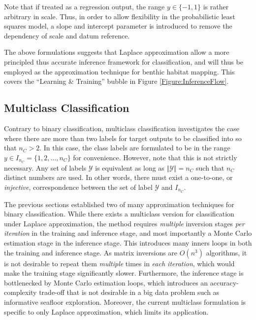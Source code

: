 				Note that if treated as a regression output, the range $y \in \{-1, 1\}$ is rather arbitrary in scale. Thus, in order to allow flexibility in the probabilistic least squares model, a slope and intercept parameter is introduced to remove the dependency of scale and datum reference.
				
				The above formulations suggests that Laplace approximation allow a more principled thus accurate inference framework for classification, and will thus be employed as the approximation technique for benthic habitat mapping. This covers the ``Learning \& Training'' bubble in Figure \ref{Figure:InferenceFlow}.
			
		\subsection{Multiclass Classification}
		\label{BenthicHabitatMapping:Classification:MulticlassClassification}
		
			Contrary to binary classification, multiclass classification investigates the case where there are more than two labels for target outputs to be classified into so that $n_{C} > 2$. In this case, the class labels are formulated to be in the range $y \in I_{n_{C}} = \{1, 2, \dots, n_{C}\}$ for convenience. However, note that this is not strictly necessary. Any set of labels $\mathcal{Y}$ is equivalent as long as $\Vert \mathcal{Y} \Vert = n_{C}$ such that $n_{C}$ distinct numbers are used. In other words, there must exist a one-to-one, or \textit{injective}, correspondence between the set of label $\mathcal{Y}$ and $I_{n_{C}}$.
			
			The previous sections established two of many approximation techniques for binary classification. While there exists a multiclass version for classification under Laplace approximation, the method requires \textit{multiple} inversion stages \textit{per iteration} in the training and inference stage, and most importantly a Monte Carlo estimation stage in the inference stage. This introduces many inners loops in both the training and inference stage. As matrix inversions are $O(n^{3})$ algorithms, it is not desirable to repeat them \textit{multiple} times in \textit{each iteration}, which would make the training stage significantly slower. Furthermore, the inference stage is bottlenecked by Monte Carlo estimation loops, which introduces an accuracy-complexity trade-off that is not desirable in a big data problem such as informative seafloor exploration. Moreover, the current multiclass formulation is specific to only Laplace approximation, which limits its application.
			
